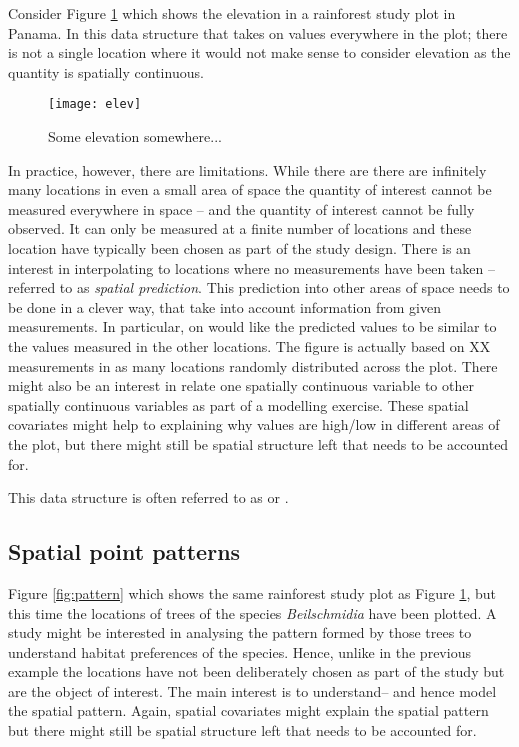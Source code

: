 
Consider Figure \ref{fig:elev} which shows the elevation in a rainforest study plot in Panama. In this data structure that  takes on values everywhere in the plot; there is not a single location where it would not make sense to consider elevation as the quantity is spatially continuous.
\begin{figure}
\centering
\texttt{[image: elev]}
\caption{\label{fig:elev} Some elevation somewhere...}
\end{figure}
In practice, however, there are limitations. While there are there are infinitely many locations in even a small area of space the quantity of interest cannot be measured everywhere in space -- and the quantity of interest cannot be fully observed. It can only be measured at a finite number of locations and these location have typically been chosen as part of the study design. There is an interest in interpolating to locations where no measurements have been taken -- referred to as \textit{spatial prediction}. This prediction into other areas of space needs to be done in a clever way, that take into account information from given measurements. In particular, on would like the predicted values to be similar to the values measured in the other locations. The figure is actually based on XX measurements in as many locations randomly distributed across the plot. There might also be an interest in relate one spatially continuous variable to other spatially continuous variables as part of a modelling exercise. These spatial covariates might help to explaining why values are high/low in different areas of the plot, but there might still be spatial structure left that needs to be accounted for.

This data structure is often referred to as \textit{} or \textit{}.

\subsection{Spatial point patterns}
Figure \ref{fig:pattern} which shows  the same rainforest study plot as Figure \ref{fig:elev}, but this time the locations of trees of the species \textit{Beilschmidia} have been plotted. A study might be interested in analysing the pattern formed by those trees to understand habitat preferences of the species. Hence, unlike in the previous example the locations have not been deliberately chosen as part of the study but are the object of interest. The main interest is to understand-- and hence model the spatial pattern.
Again, spatial covariates might explain the spatial pattern but there might still be spatial structure left that needs to be accounted for.

